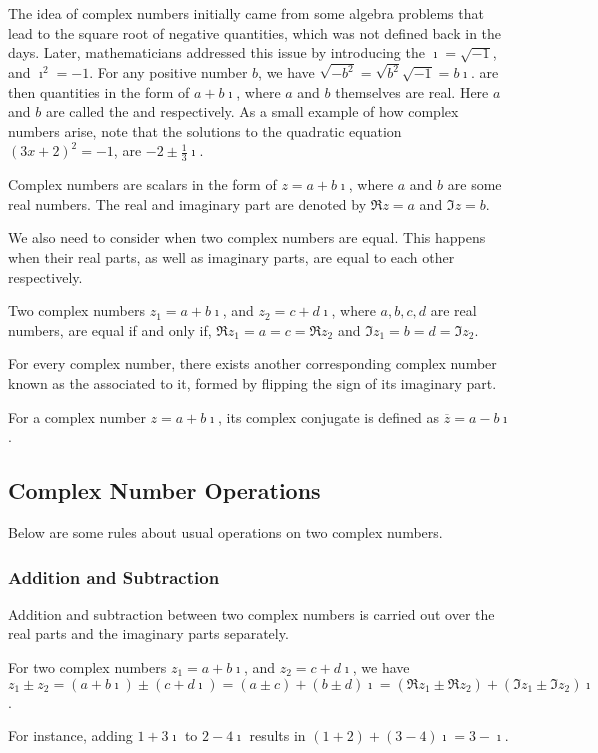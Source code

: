 The idea of complex numbers initially came from some algebra problems that lead to the square root of negative quantities, which was not defined back in the days. Later, mathematicians addressed this issue by introducing the  $\imath = \sqrt{-1}$, and $\imath^2 = -1$. For any positive number $b$, we have $\sqrt{-b^2} = \sqrt{b^2}\sqrt{-1} = b\imath$.  are then quantities in the form of $a + b\imath$, where $a$ and $b$ themselves are real. Here $a$ and $b$ are called the  and  respectively. As a small example of how complex numbers arise, note that the solutions to the quadratic equation $(3x+2)^2 = -1$, are $-2 \pm \frac{1}{3}\imath$.
\begin{defn}
Complex numbers are scalars in the form of $z = a + b\imath$, where $a$ and $b$ are some real numbers. The real and imaginary part are denoted by $\Re{z} = a$ and $\Im{z} = b$.
\end{defn}
We also need to consider when two complex numbers are equal. This happens when their real parts, as well as imaginary parts, are equal to each other respectively.
\begin{proper}
Two complex numbers $z_1 = a + b\imath$, and $z_2 = c + d\imath$, where $a, b, c, d$ are real numbers, are equal if and only if, $\Re{z_1} = a = c = \Re{z_2}$ and $\Im{z_1} = b = d = \Im{z_2}$.
\end{proper}
For every complex number, there exists another corresponding complex number known as the  associated to it, formed by flipping the sign of its imaginary part.
\begin{defn}
For a complex number $z = a + b\imath$, its complex conjugate is defined as $\overline{z} = a - b\imath$.
\end{defn}

\subsection{Complex Number Operations}
Below are some rules about usual operations on two complex numbers.
\subsubsection{Addition and Subtraction}
Addition and subtraction between two complex numbers is carried out over the real parts and the imaginary parts separately.
\begin{defn}
For two complex numbers $z_1 = a + b\imath$, and $z_2 = c + d\imath$, we have\ $z_1 \pm z_2 = (a + b\imath) \pm (c + d\imath) = (a \pm c) + (b \pm d)\imath = (\Re{z_1} \pm \Re{z_2}) + (\Im{z_1} \pm \Im{z_2})\imath$.
\end{defn}
For instance, adding $1 + 3\imath$ to $2 - 4\imath$ results in $(1+2) + (3-4)\imath = 3 - \imath$.


